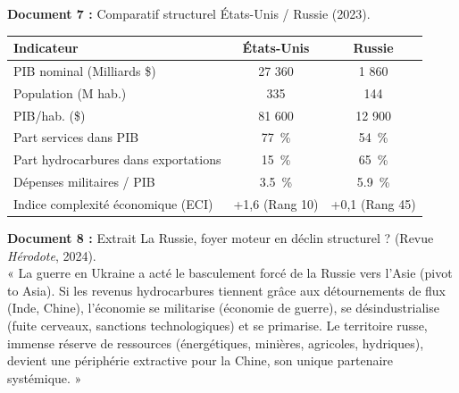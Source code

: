 \documentclass[11pt]{article}
\begin{document}
\begin{exercice}
    \textbf{Document 7 :} Comparatif structurel États-Unis / Russie (2023).\\
\begin{tabular}{lcc}
        \toprule
        Indicateur & États-Unis & Russie \\
        \midrule
        PIB nominal (Milliards \$) & 27 360 & 1 860 \\
        Population (M hab.) & 335 & 144 \\
        PIB/hab. (\$) & 81 600 & 12 900 \\
        Part services dans PIB & \SI{77}{\%} & \SI{54}{\%} \\
        Part hydrocarbures dans exportations & \SI{15}{\%} & \SI{65}{\%} \\
        Dépenses militaires / PIB & \SI{3,5}{\%} & \SI{5,9}{\%} \\
        Indice complexité économique (ECI) & +1,6 (Rang 10) & +0,1 (Rang 45) \\
        \bottomrule
    \end{tabular}

    \textbf{Document 8 :} Extrait \og La Russie, foyer moteur en déclin structurel ? \fg (Revue \textit{Hérodote}, 2024).\\
    « La guerre en Ukraine a acté le basculement forcé de la Russie vers l'Asie (pivot to Asia). Si les revenus hydrocarbures tiennent grâce aux détournements de flux (Inde, Chine), l'économie se militarise (économie de guerre), se désindustrialise (fuite cerveaux, sanctions technologiques) et se primarise. Le territoire russe, immense réserve de ressources (énergétiques, minières, agricoles, hydriques), devient une périphérie extractive pour la Chine, son unique partenaire systémique. »


\end{exercice}
\end{document}
